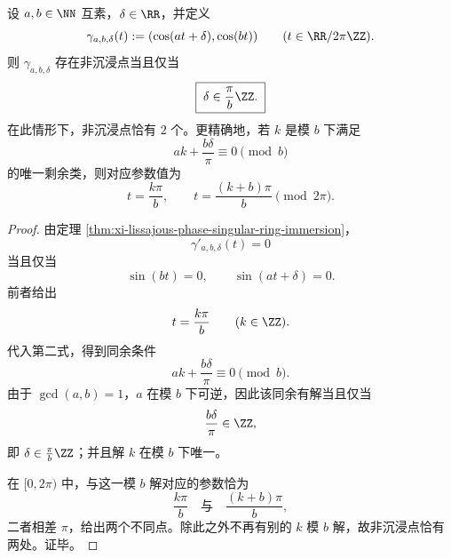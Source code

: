 \begin{proposition}\label{prop:xi-time-part62da-lissajous-two-nonimmersed-points}
设 \(a,b\in\NN\) 互素，\(\delta\in\RR\)，并定义
\[
\gamma_{a,b,\delta}(t):=(\cos(at+\delta),\cos(bt))
\qquad (t\in\RR/2\pi\ZZ).
\]
则 \(\gamma_{a,b,\delta}\) 存在非沉浸点当且仅当
\[
\boxed{\;
\delta\in \frac{\pi}{b}\ZZ.\;}
\]
在此情形下，非沉浸点恰有 \(2\) 个。更精确地，若 \(k\) 是模 \(b\) 下满足
\[
ak+\frac{b\delta}{\pi}\equiv 0\pmod b
\]
的唯一剩余类，则对应参数值为
\[
\boxed{\;
t=\frac{k\pi}{b},
\qquad
t=\frac{(k+b)\pi}{b}\pmod{2\pi}.\;}
\]
\end{proposition}
\begin{proof}
由定理 \ref{thm:xi-lissajous-phase-singular-ring-immersion}，
\[
\gamma'_{a,b,\delta}(t)=0
\]
当且仅当
\[
\sin(bt)=0,
\qquad
\sin(at+\delta)=0.
\]
前者给出
\[
t=\frac{k\pi}{b}
\qquad(k\in\ZZ).
\]
代入第二式，得到同余条件
\[
ak+\frac{b\delta}{\pi}\equiv 0\pmod b.
\]
由于 \(\gcd(a,b)=1\)，\(a\) 在模 \(b\) 下可逆，因此该同余有解当且仅当
\[
\frac{b\delta}{\pi}\in \ZZ,
\]
即 \(\delta\in \frac{\pi}{b}\ZZ\)；并且解 \(k\) 在模 \(b\) 下唯一。

在 \([0,2\pi)\) 中，与这一模 \(b\) 解对应的参数恰为
\[
\frac{k\pi}{b}
\quad\text{与}\quad
\frac{(k+b)\pi}{b},
\]
二者相差 \(\pi\)，给出两个不同点。除此之外不再有别的 \(k\) 模 \(b\) 解，故非沉浸点恰有两处。证毕。
\end{proof}

